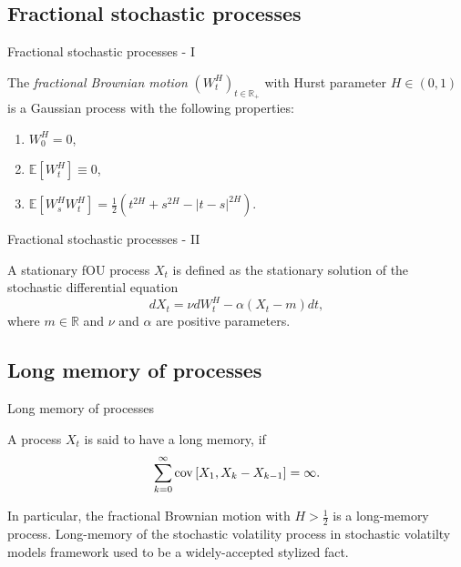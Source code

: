         \subsection{Fractional stochastic processes}
            \begin{frame}{Fractional stochastic processes - I}
                \begin{definition}
                    The \emph{fractional Brownian motion} $(W_t^H)_{t\in \mathbb{R_+}}$ with Hurst 
                    parameter $H \in (0, 1)$ is a Gaussian process with the following properties:
                    \begin{enumerate}
                        \item $W_0^H = 0$,
                        \item $\mathbb{E}\left[W_t^H\right] \equiv 0$,
                        \item $\mathbb{E}\left[W_s^H W_t^H\right] = \frac{1}{2} \left(t^{2H} + s^{2H} - |t-s|^{2H}\right)$.
                    \end{enumerate}
                \end{definition}
            \end{frame}   

            \begin{frame}{Fractional stochastic processes - II}
                \begin{definition}
                    A stationary fOU process $X_t$ is defined as the stationary solution of the stochastic differential equation
                    \begin{equation}
                        dX_t = \nu dW^H_t - \alpha (X_t - m)dt,
                    \end{equation}
                    where $m \in \mathbb{R}$ and $\nu$ and $\alpha$ are positive parameters.
                \end{definition}
            \end{frame} 
        \subsection{Long memory of processes}
            \begin{frame}{Long memory of processes}
                \begin{definition}
                    A process $X_t$ is said to have a long memory, if 
                    \begin{equation}
                        \sum_{k=0}^{\infty}\operatorname*{cov}\left[X_1 , X_{k} - X_{k-1}\right] = \infty.
                    \end{equation}
                \end{definition}
        
                In particular, the fractional Brownian motion with $H > \frac{1}{2}$ is a long-memory process.
                Long-memory of the stochastic volatility process in stochastic volatilty models framework used to be a 
                widely-accepted stylized fact.
            \end{frame}

